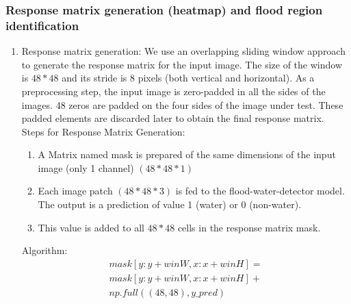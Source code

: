 \documentclass{IEEEtran}
\begin{document}
\subsubsection{Response matrix generation (heatmap) and flood region identification}
	\begin{enumerate}
\item 	Response matrix generation: We use an overlapping sliding window approach to generate the response matrix for the input image. The size of the window is $48*48$ and its stride is 8 pixels (both vertical and horizontal). As a preprocessing step, the input image is zero-padded in all the sides of the images. 48 zeros are padded on the four sides of the image under test. These padded elements are discarded later to obtain the final response matrix.\\
Steps for Response Matrix Generation:
		\begin{enumerate}
		\item A Matrix named mask is prepared of the same dimensions of the input image (only 1 channel) $(48*48*1)$
		\item Each image patch $(48*48*3)$ is fed to the flood-water-detector model. The output is a prediction of value 1 (water) or 0 (non-water).
		\item This value is added to all $48*48$  cells in the response matrix mask.
		\end{enumerate}
Algorithm:\\
\begin{equation}
\begin{aligned}
	mask[y:y + winW, x:x + winH] =\\
	 mask[y:y + winW, x:x + winH]+\\
	 np.full((48,48), y\_pred)
\end{aligned}
\end{equation}


\end{enumerate}
\end{document}
